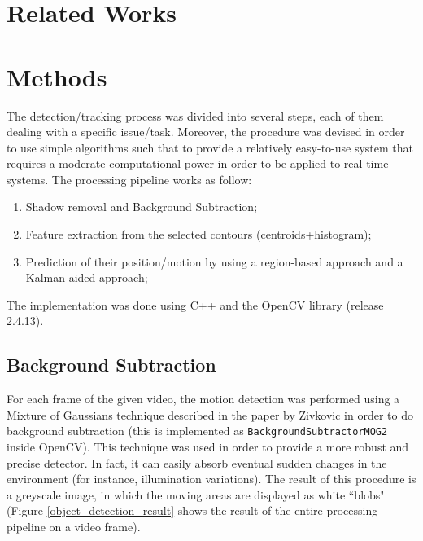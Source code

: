 \documentclass[runningheads]{llncs}
\begin{document}
\section{Related Works}

\section{Methods}

The detection/tracking process was divided into several steps, each of them dealing with a specific issue/task. Moreover, the procedure was devised in order to use simple algorithms such that to provide a relatively easy-to-use system that requires a moderate computational power in order to be applied to real-time systems. The processing pipeline works as follow:
\begin{enumerate}
\item Shadow removal and Background Subtraction;
\item Feature extraction from the selected contours (centroids+histogram);
\item Prediction of their position/motion by using a region-based approach and a Kalman-aided approach;
\end{enumerate}
The implementation was done using C++ and the OpenCV library (release 2.4.13).

\subsection{Background Subtraction}
For each frame of the given video, the motion detection was performed using a Mixture of Gaussians technique described in the paper by Zivkovic \cite{Mog} in order to do background subtraction (this is implemented as \texttt{BackgroundSubtractorMOG2}\cite{backgroundsubtractormog} inside OpenCV). This technique was used in order to provide a more robust and precise detector. In fact, it can easily absorb eventual sudden changes in the environment (for instance, illumination variations). The result of this procedure is a greyscale image, in which the moving areas are displayed as white ``blobs" (Figure \ref{object_detection_result} shows the result of the entire processing pipeline on a video frame).
\smallskip
\end{document}
